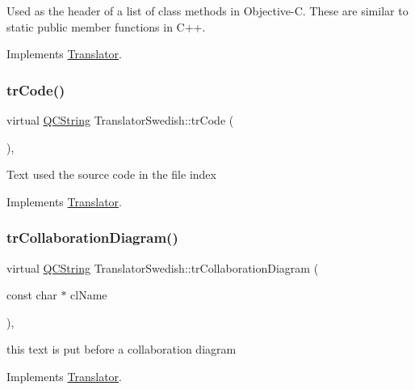 Used as the header of a list of class methods in Objective-\/C. These are similar to static public member functions in C++. 

Implements \mbox{\hyperlink{class_translator}{Translator}}.

\mbox{\label{class_translator_swedish_a026ca5698283320fb7a4341ffd11badd}} 
\subsubsection{\texorpdfstring{trCode()}{trCode()}}
{\footnotesize\ttfamily virtual \mbox{\hyperlink{class_q_c_string}{Q\+C\+String}} Translator\+Swedish\+::tr\+Code (\begin{DoxyParamCaption}{ }\end{DoxyParamCaption})\hspace{0.3cm}{\ttfamily [inline]}, {\ttfamily [virtual]}}

Text used the source code in the file index 

Implements \mbox{\hyperlink{class_translator}{Translator}}.

\mbox{\label{class_translator_swedish_a7aa569f4af3fae89c1c18e51c3d2711d}} 
\subsubsection{\texorpdfstring{trCollaborationDiagram()}{trCollaborationDiagram()}}
{\footnotesize\ttfamily virtual \mbox{\hyperlink{class_q_c_string}{Q\+C\+String}} Translator\+Swedish\+::tr\+Collaboration\+Diagram (\begin{DoxyParamCaption}\item[{const char $\ast$}]{cl\+Name }\end{DoxyParamCaption})\hspace{0.3cm}{\ttfamily [inline]}, {\ttfamily [virtual]}}

this text is put before a collaboration diagram 

Implements \mbox{\hyperlink{class_translator}{Translator}}.

\mbox{\label{class_translator_swedish_a22d748f1d39b3e8de14d67ed625e713b}} 
